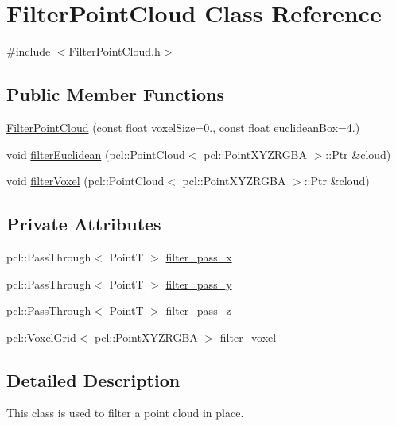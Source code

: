 \hypertarget{classFilterPointCloud}{\section{Filter\-Point\-Cloud Class Reference}
\label{classFilterPointCloud}
}


{\ttfamily \#include $<$Filter\-Point\-Cloud.\-h$>$}

\subsection*{Public Member Functions}
\begin{DoxyCompactItemize}
\item 
\hyperlink{classFilterPointCloud_a1b9e85f9248e896b7ff72f7a53e3b4c7}{Filter\-Point\-Cloud} (const float voxel\-Size=0., const float euclidean\-Box=4.)
\item 
void \hyperlink{classFilterPointCloud_a871695368a71e98765f21d98ed353986}{filter\-Euclidean} (pcl\-::\-Point\-Cloud$<$ pcl\-::\-Point\-X\-Y\-Z\-R\-G\-B\-A $>$\-::Ptr \&cloud)
\item 
void \hyperlink{classFilterPointCloud_a425feb266962f406e97c70733b64f23e}{filter\-Voxel} (pcl\-::\-Point\-Cloud$<$ pcl\-::\-Point\-X\-Y\-Z\-R\-G\-B\-A $>$\-::Ptr \&cloud)
\end{DoxyCompactItemize}
\subsection*{Private Attributes}
\begin{DoxyCompactItemize}
\item 
pcl\-::\-Pass\-Through$<$ Point\-T $>$ \hyperlink{classFilterPointCloud_af657b269e7d2b17ede230f0193ceb332}{filter\-\_\-pass\-\_\-x}
\item 
pcl\-::\-Pass\-Through$<$ Point\-T $>$ \hyperlink{classFilterPointCloud_a9340b74286052b5ac7de9eadd2e0a6b3}{filter\-\_\-pass\-\_\-y}
\item 
pcl\-::\-Pass\-Through$<$ Point\-T $>$ \hyperlink{classFilterPointCloud_a3cf0458f538181a07634ba2d33ae0b95}{filter\-\_\-pass\-\_\-z}
\item 
pcl\-::\-Voxel\-Grid$<$ pcl\-::\-Point\-X\-Y\-Z\-R\-G\-B\-A $>$ \hyperlink{classFilterPointCloud_a02984936aef2ec44e87681f6d36f69cc}{filter\-\_\-voxel}
\end{DoxyCompactItemize}


\subsection{Detailed Description}
This class is used to filter a point cloud in place. 

